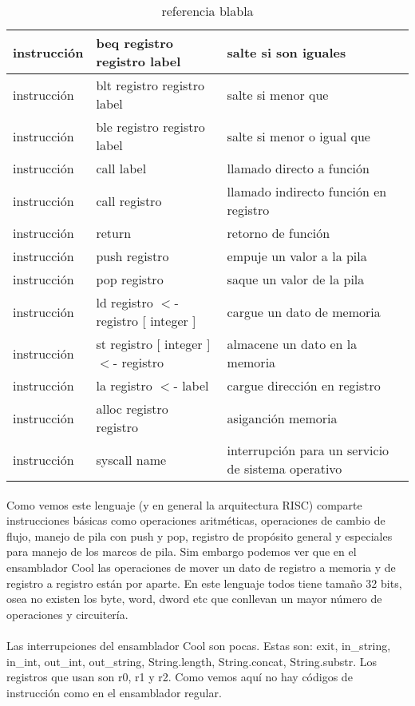\documentclass[10pt,a4paper]{article}
\begin{document}
\begin{center}
\begin{table}
\begin{tabular}{| l | l | p{5cm} |}
instrucción & beq registro registro label & salte si son iguales  \\ \hline
instrucción & blt registro registro label & salte si menor que  \\ \hline
instrucción & ble registro registro label & salte si menor o igual que \\ \hline
instrucción & call label & llamado directo a función \\ \hline
instrucción & call registro & llamado indirecto función en registro \\ \hline
instrucción & return & retorno de función \\ \hline
instrucción & push registro & empuje un valor a la pila\\ \hline
instrucción & pop registro & saque un valor de la pila \\ \hline
instrucción & ld registro $<$- registro [ integer ] & cargue un dato de memoria  \\ \hline
instrucción & st registro [ integer ] $<$- registro & almacene un dato en la memoria \\ \hline
instrucción & la registro $<$- label & cargue dirección en registro\\ \hline
instrucción & alloc registro registro & asiganción memoria  \\ \hline
instrucción & syscall name & interrupción para un servicio de sistema operativo\\
\hline 
\end{tabular}
\caption{referencia blabla}
\end{table}
\end{center}

\paragraph{}
Como vemos este lenguaje (y en general la arquitectura RISC) comparte instrucciones básicas como operaciones aritméticas, 
operaciones de cambio de flujo, manejo de pila con push y pop, registro de propósito general y especiales para manejo de los marcos de pila. Sim embargo podemos ver que en el ensamblador Cool las operaciones de mover un dato de registro a memoria y de registro a registro están por aparte. En este lenguaje todos tiene tamaño 32 bits, osea no existen los byte, word, dword etc que conllevan un mayor número de operaciones y circuitería.

\paragraph{}
Las interrupciones del ensamblador Cool son pocas. Estas son: exit, in\_string, in\_int, out\_int, out\_string, String.length, String.concat, String.substr. Los registros que usan son r0, r1 y r2. Como vemos aquí no hay códigos de instrucción como en el ensamblador regular.
\end{document}
